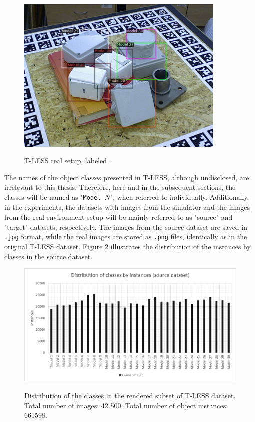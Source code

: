 \begin{figure}[htb]
	\begin{center}
		\includegraphics[width=10cm]{./tless_real_annotated.png}
	\end{center}
	\caption{T-LESS real setup, labeled
\cite{hodan2017tless}.}
	\begin{center}
		\label{tless_real_example}
	\end{center}
\end{figure}

The names of the object classes presented in T-LESS, although undisclosed, are irrelevant to this thesis. Therefore, here and in the subsequent sections, the classes will be named as "\texttt{Model $N$}", when referred to individually. Additionally, in the experiments, the datasets with images from the simulator and the images from the real environment setup will be mainly referred to as "source" and "target" datasets, respectively. The images from the source dataset are saved in \texttt{.jpg} format, while the real images are stored as \texttt{.png} files, identically as in the original T-LESS \cite{hodan2017tless} dataset. Figure \ref{tless_distribution_rend} illustrates the distribution of the instances by classes in the source dataset.  

\begin{figure}[htb]
	\begin{center}
		\includegraphics[width=14cm]{./rendered_distribution.png}
	\end{center}
	\caption{Distribution of the classes in the rendered subset of T-LESS dataset. Total number of images: 42 500. Total number of object instances: 661598.}
	\begin{center}
		\label{tless_distribution_rend}
	\end{center}
\end{figure}

